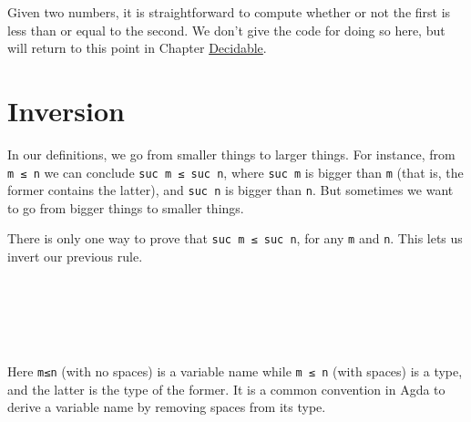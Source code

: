Given two numbers, it is straightforward to compute whether or not the
first is less than or equal to the second. We don't give the code for
doing so here, but will return to this point in Chapter
\protect\hyperlink{Decidable}{Decidable}.

\hypertarget{inversion}{%
\section{Inversion}\label{inversion}}

In our definitions, we go from smaller things to larger things. For
instance, from \texttt{m\ ≤\ n} we can conclude
\texttt{suc\ m\ ≤\ suc\ n}, where \texttt{suc\ m} is bigger than
\texttt{m} (that is, the former contains the latter), and
\texttt{suc\ n} is bigger than \texttt{n}. But sometimes we want to go
from bigger things to smaller things.

There is only one way to prove that \texttt{suc\ m\ ≤\ suc\ n}, for any
\texttt{m} and \texttt{n}. This lets us invert our previous rule.

\begin{fence}
\begin{code}%
\>[0]\AgdaSpace{}%
\AgdaSymbol{:}\AgdaSpace{}%
\AgdaSpace{}%
\AgdaSymbol{\{}\AgdaSpace{}%
\AgdaSpace{}%
\AgdaSymbol{:}\AgdaSpace{}%
\AgdaSymbol{\}}\<%
\\
\>[0][@{}l@{\AgdaIndent{0}}]%
\>[2]%
\>[132I]\AgdaSpace{}%
\AgdaSpace{}%
\AgdaSpace{}%
\AgdaSpace{}%
\<%
\\
\>[.][@{}l@{}]\<[132I]%
\>[4]\AgdaComment{-------------}\<%
\\
%
\>[2]\AgdaSpace{}%
\AgdaSpace{}%
\AgdaSpace{}%
\<%
\\
\>[0]\AgdaSpace{}%
\AgdaSymbol{(}\AgdaSpace{}%
\AgdaSymbol{)}\AgdaSpace{}%
\AgdaSymbol{=}\AgdaSpace{}%
\<%
\end{code}
\end{fence}

Here \texttt{m≤n} (with no spaces) is a variable name while
\texttt{m\ ≤\ n} (with spaces) is a type, and the latter is the type of
the former. It is a common convention in Agda to derive a variable name
by removing spaces from its type.

